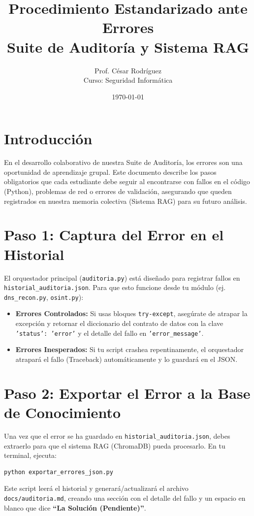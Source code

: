 \documentclass[12pt,a4paper]{article}
\title{\textbf{Procedimiento Estandarizado ante Errores} \\ \large Suite de Auditoría y Sistema RAG}
\author{Prof. César Rodríguez \\ \small Curso: Seguridad Informática}
\date{\today}
\begin{document}
\maketitle

\section*{Introducción}
En el desarrollo colaborativo de nuestra Suite de Auditoría, los errores son una oportunidad de aprendizaje grupal. Este documento describe los pasos obligatorios que cada estudiante debe seguir al encontrarse con fallos en el código (Python), problemas de red o errores de validación, asegurando que queden registrados en nuestra memoria colectiva (Sistema RAG) para su futuro análisis.

\section*{Paso 1: Captura del Error en el Historial}
El orquestador principal (\texttt{auditoria.py}) está diseñado para registrar fallos en \texttt{historial\_auditoria.json}. Para que esto funcione desde tu módulo (ej. \texttt{dns\_recon.py}, \texttt{osint.py}):
\begin{itemize}[label=\textbullet]
    \item \textbf{Errores Controlados:} Si usas bloques \texttt{try-except}, asegúrate de atrapar la excepción y retornar el diccionario del contrato de datos con la clave \texttt{'status': 'error'} y el detalle del fallo en \texttt{'error\_message'}.
    \item \textbf{Errores Inesperados:} Si tu script crashea repentinamente, el orquestador atrapará el fallo (Traceback) automáticamente y lo guardará en el JSON.
\end{itemize}

\section*{Paso 2: Exportar el Error a la Base de Conocimiento}
Una vez que el error se ha guardado en \texttt{historial\_auditoria.json}, debes extraerlo para que el sistema RAG (ChromaDB) pueda procesarlo. En tu terminal, ejecuta:
\begin{lstlisting}[language=bash]
python exportar_errores_json.py
\end{lstlisting}
Este script leerá el historial y generará/actualizará el archivo \texttt{docs/auditoria.md}, creando una sección con el detalle del fallo y un espacio en blanco que dice \textbf{``La Solución (Pendiente)''}.
\end{document}
